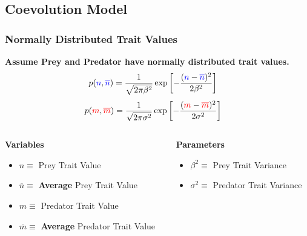 \documentclass[10pt]{beamer}
\begin{document}
\subsection{Coevolution Model}
\begin{frame}
	\frametitle{Normally Distributed Trait Values}
	{\bf Assume {\color{blue}Prey} and {\color{red}Predator} have normally distributed trait values.}
	\begin{align*}
		p({\color{blue}n}, {\color{blue}\overline{n}}) &= \frac{1}{\sqrt{2\pi\beta^2}}\exp\left[{-\frac{({\color{blue}n} - {\color{blue}\overline{n}})^2}{2\beta^2}}\right]
	\end{align*}
	\begin{align*}
		p({\color{red}m}, {\color{red}\overline{m}}) &= \frac{1}{\sqrt{2\pi\sigma^2}}\exp\left[{-\frac{({\color{red}m} - {\color{red}\overline{m}})^2}{2\sigma^2}}\right]
	\end{align*}
	\begin{columns}
		\begin{column}{0.50\textwidth}
			{\bf Variables}
			\begin{itemize}
				\item \footnotesize{\color{blue}$n \equiv $ Prey Trait Value}
				\item {\color{blue}$\overline{n} \equiv $ {\bf Average} Prey Trait Value}
				\item {\color{red}$m \equiv $ Predator Trait Value}
				\item {\color{red}$\overline{m} \equiv $ {\bf Average} Predator Trait Value}
			\end{itemize}
		\end{column}
		\begin{column}{0.42\textwidth}
			{\bf Parameters}
			\begin{itemize}
				\item \footnotesize$\beta^2 \equiv $ Prey Trait Variance
				\item $\sigma^2 \equiv $ Predator Trait Variance
			\end{itemize}
		\end{column}
	\end{columns}
\end{frame}
\end{document}
